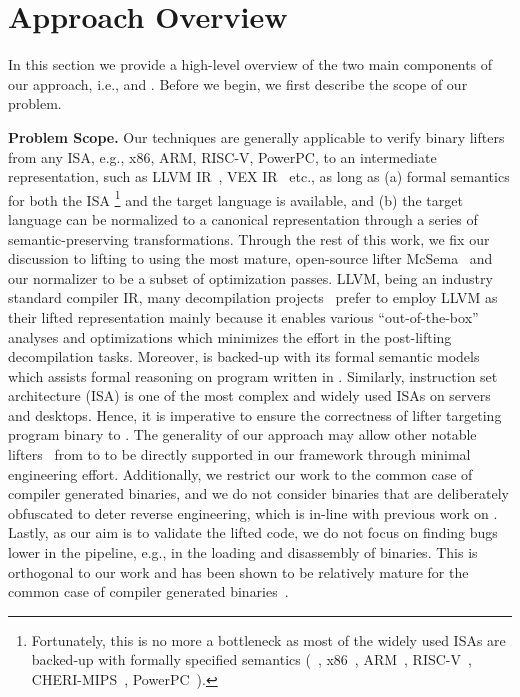 \section{Approach Overview}\label{sec:Approach}

In this section we provide a high-level overview of the two main components of
our approach, i.e., \siv and \plv. Before we begin, we first describe the
scope of our problem.

\textbf{Problem Scope.} Our techniques are generally applicable to verify
binary lifters from any ISA, e.g., x86, ARM, RISC-V, PowerPC, to an
intermediate representation, such as LLVM IR~\cite{LLVM:CGO04}, VEX
IR~\cite{Valgrind:ENTCS03} etc., as long as (a) formal semantics for both the
ISA
%
\footnote{Fortunately, this is no more a bottleneck as most
of the widely used ISAs are backed-up with formally specified semantics
(\ISA~\cite{DasguptaAdve:PLDI19,Goel:FMCAD14},
x86~\cite{TSL:TOPLAS13,Leroy:2009,cakeML19},
ARM~\cite{sail-popl2019,ARMSel4:09,ArmFox2003},
RISC-V~\cite{cakeML19,Leroy:2009}, CHERI-MIPS~\cite{sail-popl2019},
PowerPC~\cite{Leroy:2009,TSL:TOPLAS13}).}
%
and the target language is available, and (b) the target language can be
normalized to a canonical representation through a series of
semantic-preserving transformations.  Through the rest of this work, we fix
our discussion to lifting \ISA to \LLVM using the most mature, open-source
lifter McSema~\cite{McSema:Recon14} and our normalizer to be a subset of \LLVM
optimization passes.
%
LLVM, being an industry standard compiler IR,  many decompilation
projects~\cite{McSema:Recon14,Remill,FCD,reopt,llvm-mctoll} prefer to employ
LLVM as their lifted representation mainly because it enables various
``out-of-the-box'' analyses
and optimizations  which minimizes the effort in the post-lifting
decompilation tasks. Moreover, \LLVM is backed-up with its formal
semantic models~\cite{LLVMSEMA,Vellvm12} which assists formal
reasoning on program written in \LLVM.
%
Similarly, \ISA instruction set architecture (ISA) is
one of the most complex and widely used ISAs on servers and desktops. Hence, it
is imperative to  ensure the correctness of lifter targeting \ISA program
binary to \LLVM.
%
The generality of our approach may allow other notable lifters~\cite{FCD,DiFederico:CC2017} 
from \ISA to \LLVM to be directly supported in our framework through minimal
engineering effort. Additionally, we restrict our work to the common case of
compiler generated binaries, and we do not consider binaries that are
deliberately obfuscated to deter reverse engineering, which is in-line with
previous work on \tv.  Lastly, as our aim is to validate the lifted code, we
do not focus on finding bugs lower in the pipeline, e.g., in the loading and
disassembly of binaries.  This is orthogonal to our work and has been shown to
be relatively mature for the common case of compiler generated
binaries~\cite{197147}.

